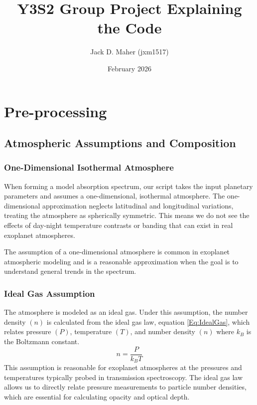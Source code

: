 \documentclass{article}
\title{Y3S2 Group Project Explaining the Code}
\author{Jack D. Maher (jxm1517)}
\date{February 2026}
\begin{document}
\maketitle
\section{Pre-processing}
\subsection{Atmospheric Assumptions and Composition}
\label{Section:AtmosphericAssumptions}

\subsubsection{One-Dimensional Isothermal Atmosphere}
\label{OneDimensionalIsothermalAtmosphere}
When forming a model absorption spectrum, our script takes the input planetary parameters and assumes a one-dimensional, isothermal atmosphere.
The one-dimensional approximation neglects latitudinal and longitudinal variations, treating the atmosphere as spherically symmetric.
This means we do not see the effects of day-night temperature contrasts or banding that can exist in real exoplanet atmospheres.

The assumption of a one-dimensional atmosphere is common in exoplanet atmospheric modeling \cite{Seager2000,Brown2001} and is a reasonable approximation when the goal is to understand general trends in the spectrum.

\subsubsection{Ideal Gas Assumption}
\label{IdealGasAssumption}
The atmosphere is modeled as an ideal gas. 
Under this assumption, the number density $(n)$ is calculated from the ideal gas law, equation \ref{Eq:IdealGas}, which relates pressure $(P)$, temperature $(T)$, and number density $(n)$ where $k_B$ is the Boltzmann constant.
\begin{equation}
	n = \frac{P}{k_B T}
	\label{Eq:IdealGas}
\end{equation}
This assumption is reasonable for exoplanet atmospheres at the pressures and temperatures typically probed in transmission spectroscopy. 
The ideal gas law allows us to directly relate pressure measurements to particle number densities, which are essential for calculating opacity and optical depth.
\end{document}
